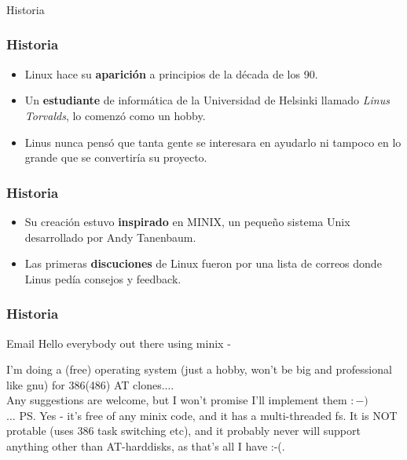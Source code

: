 \frame
{
\frametitle{}
\begin{center}
	\Huge{Historia}
\end{center}
}

\frame
{
\frametitle{Historia}
\begin{itemize}
	\item Linux hace su \textbf{aparición} a principios de la década de los 90.
	\item Un \textbf{estudiante} de informática de la Universidad de Helsinki
		llamado \emph{Linus Torvalds}, lo comenzó como un hobby.
	\item Linus nunca pensó que tanta gente se interesara en ayudarlo
		ni tampoco en lo grande que se convertiría su proyecto.
\end{itemize}
}
\frame
{
\frametitle{Historia}
\begin{itemize}
	\item Su creación estuvo \textbf{inspirado} en MINIX, un pequeño sistema Unix
		desarrollado por Andy Tanenbaum.
	\item Las primeras \textbf{discuciones} de Linux fueron por una lista de correos
		donde Linus pedía consejos y feedback.
\end{itemize}
}

\frame
{
\frametitle{Historia}
\begin{block}{Email}
	Hello everybody out there using minix -

	I'm doing a (free) operating system (just a hobby, won't be big and
	professional like gnu) for 386(486) AT clones.$\ldots$\\\vspace{0.5cm}
	Any suggestions are welcome, but I won't promise I'll implement them $:-)$\\\vspace{0.5cm}
	$\ldots$
	PS.  Yes - it's free of any minix code, and it has a multi-threaded fs. 
	It is NOT protable (uses 386 task switching etc), and it probably never
	will support anything other than AT-harddisks, as that's all I have :-(. 
\end{block}
}
